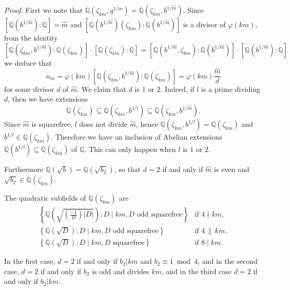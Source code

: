 \documentclass[twoside,final,reqno,noamsfonts]{birkartspecial}
\begin{document}
\removelastskip\par\medskip
\noindent\emph{Proof.}
First we note that
${\mathbb Q}(\zeta_{km},q^{1/m})={\mathbb Q}(\zeta_{km},b^{1/\hat{m}})$. Since $[{\mathbb Q}(b^{1/\hat{m}}):\mathbb{Q}]=\hat{m}$ and
$[{\mathbb Q}(b^{1/\hat{m}})(\zeta_{km}):\mathbb{Q}(b^{1/\hat{m}})]$
is a divisor of $\varphi(km)$, from the identity
$$[{\mathbb Q}(\zeta_{km},b^{1/\hat{m}}):{\mathbb Q}(\zeta_{km})]\cdot[{\mathbb Q}(\zeta_{km}):{\mathbb Q}]= [{\mathbb Q}(b^{1/\hat{m}},\zeta_{km}):\mathbb{Q}(b^{1/\hat{m}})]\cdot [{\mathbb Q}(b^{1/\hat{m}}):\mathbb{Q}] $$
we deduce that
$$n_m=\varphi(km)\left[{\mathbb Q}(\zeta_{km},b^{1/\hat{m}}):{\mathbb
    Q}(\zeta_{km})\right]
=\varphi(km)\frac{\hat{m}
}{d}$$ for some divisor $d$ of $\hat{m}$. We claim that $d$ is $1$ or $2$.
Indeed, if $l$ is a prime dividing $d$, then we have extensions
$$
{\mathbb Q}(\zeta_{km})
\subseteq
{\mathbb Q}(\zeta_{km},b^{1/l})
\subseteq
{\mathbb Q}(\zeta_{km},b^{1/\hat{m}})
.$$
Since $\hat{m}$ is squarefree, $l$ does not divide $\hat{m}$,
 hence ${\mathbb Q}(\zeta_{km},b^{1/l})={\mathbb Q}(\zeta_{km})$ and
 $b^{1/l}\in{\mathbb Q}(\zeta_{km})$.
Therefore we have an inclusion of Abelian extensions
${\mathbb Q}(b^{1/l})\subseteq{\mathbb Q}(\zeta_{km})$ of ${\mathbb Q}$.
This can only happen when $l$ is $1$ or $2$.

Furthermore ${\mathbb Q}(\sqrt{b})={\mathbb Q}(\sqrt{b_2})$, so that $d=2$ if and
only if $\hat{m}$ is even and $\sqrt{b_2}\in{\mathbb Q}(\zeta_{km})$.

The quadratic subfields of ${\mathbb Q}(\zeta_{km})$ are
$$
\begin{array}{ll}
\left\{{\mathbb Q}(\sqrt{{\left(\frac{-1}{D}\right)}|D|})
\colon D \mid km, D \text{ odd squarefree}
\right\}
& \text{if }4\nmid km,\\
\left\{{\mathbb Q}(\sqrt{D})
\colon D \mid km, D \text{ odd squarefree}
\right\}
 & \text{if }4\,\|\, km, \\
\left\{{\mathbb Q}(\sqrt{D})
\colon D \mid km, D \text{ squarefree}
\right\}
 & \text{if }8\mid km.
\end{array}
$$

In the first case, $d=2$ if and only if $b_2|km$ and $b_2\equiv1 \bmod 4 $,
and  in the second
case, $d=2$ if and only if $b_2$ is odd and divides $km$,
and in the third case $d=2$ if and only if $b_2|km$.
\end{document}
